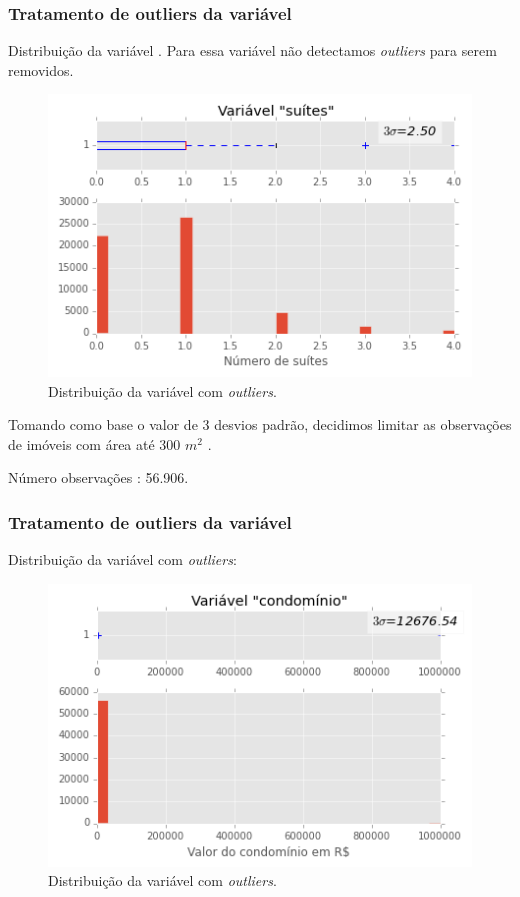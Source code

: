  
 
 \subsubsection{Tratamento de outliers da variável }
 
 
 
 Distribuição da variável . Para essa variável não detectamos \textit{outliers} para serem removidos. 
 
 
 \begin{figure}[H]
 	\centering
 	\includegraphics[width=0.8\linewidth]{img/var_suites_boxhist_antes}
 	\caption{Distribuição da variável  com \textit{outliers}.}
 	\label{fig:var_suites_boxhist_antes}
 \end{figure}
 
 Tomando como base o valor de 3 desvios padrão, decidimos limitar as observações de imóveis com área até 300 $ m^2 $ . 
 
 Número observações : 56.906. 
 
 
 
 \subsubsection{Tratamento de outliers da variável }
 
 
 
 Distribuição da variável  com \textit{outliers}:
 
 
 \begin{figure}[H]
 	\centering
 	\includegraphics[width=0.8\linewidth]{img/var_condominio_boxhist_antes}
 	\caption{Distribuição da variável  com \textit{outliers}.}
 	\label{fig:var_condominio_boxhist_antes}
 \end{figure}
 
